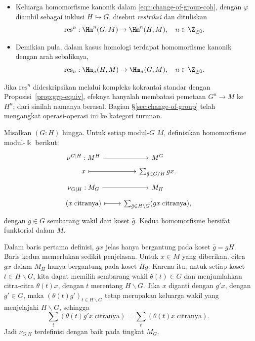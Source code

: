 \begin{itemize}
	\item Keluarga homomorfisme kanonik dalam
	\eqref{eqn:change-of-group-coh}, dengan $\varphi$ diambil sebagai inklusi
	$H\hookrightarrow G$, disebut \emph{restriksi} dan dituliskan
	\[ \mathrm{res}^n: \Hm^n(G, M) \to \Hm^n(H, M), \quad n \in \Z_{\geq 0}. \]
	\item Demikian pula, dalam kasus homologi terdapat homomorfisme kanonik
	dengan arah sebaliknya,
	\[ \mathrm{res}_n: \Hm_n(H, M) \to \Hm_n(G, M), \quad n \in \Z_{\geq 0}. \]
\end{itemize}
Jika $\mathrm{res}^n$ dideskripsikan melalui kompleks kokrantai standar
dengan Proposisi~\ref{prop:grp-equiv}, efeknya hanyalah membatasi pemetaan
$G^n\to M$ ke $H^n$; dari sinilah namanya berasal. Bagian
\S\ref{sec:change-of-group} telah mengangkat operasi-operasi ini ke
kategori turunan.

\begin{definisi}\label{def:cor-zero}
	Misalkan $(G:H)$ hingga. Untuk setiap modul-$G$ $M$, definisikan
	homomorfisme modul-$\Bbbk$ berikut:
	\[\begin{tikzcd}[row sep=tiny]
		\nu^{G|H}: M^H \arrow[r] & M^G \\
		x \arrow[mapsto, r] & \sum_{\bar{g} \in G/H} gx, \\
		\nu_{G|H}: M_G \arrow[r] & M_H \\
		(x \;\text{citranya}) \arrow[mapsto, r] & \sum_{\bar{g} \in H \backslash G} (gx \;\text{citranya}),
	\end{tikzcd}\]
	dengan $g\in G$ sembarang wakil dari koset $\bar g$. Kedua homomorfisme
	bersifat funktorial dalam $M$.
\end{definisi}

Dalam baris pertama definisi, $gx$ jelas hanya bergantung pada koset
$\bar g=gH$. Baris kedua memerlukan sedikit penjelasan. Untuk $x\in M$ yang
diberikan, citra $gx$ dalam $M_H$ hanya bergantung pada koset $Hg$. Karena
itu, untuk setiap koset $t\in H\backslash G$, kita dapat memilih sembarang
wakil $\theta(t)\in G$ dan menjumlahkan citra-citra $\theta(t)x$, dengan $t$
merentang $H\backslash G$. Jika $x$ diganti dengan $g'x$, dengan
$g'\in G$, maka $(\theta(t)g')_{t\in H\backslash G}$ tetap merupakan
keluarga wakil yang menjelajahi $H\backslash G$, sehingga
\[ \sum_t (\theta(t) g' x \;\text{citranya}) = \sum_t (\theta(t) x \;\text{citranya}). \]
Jadi $\nu_{G|H}$ terdefinisi dengan baik pada tingkat $M_G$.

